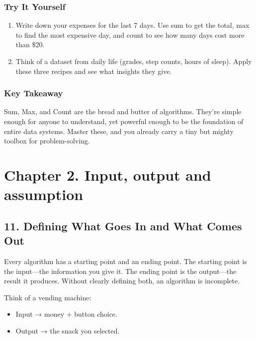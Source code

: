 \documentclass[
  letterpaper,
  DIV=11,
  numbers=noendperiod]{scrreprt}
\providecommand{\tightlist}{%
  \setlength{\itemsep}{0pt}\setlength{\parskip}{0pt}}
\begin{document}
\subsubsection{Try It Yourself}\label{try-it-yourself-9}

\begin{enumerate}
\def\labelenumi{\arabic{enumi}.}
\tightlist
\item
  Write down your expenses for the last 7 days. Use sum to get the
  total, max to find the most expensive day, and count to see how many
  days cost more than \$20.
\item
  Think of a dataset from daily life (grades, step counts, hours of
  sleep). Apply these three recipes and see what insights they give.
\end{enumerate}

\subsubsection{Key Takeaway}\label{key-takeaway-8}

Sum, Max, and Count are the bread and butter of algorithms. They're
simple enough for anyone to understand, yet powerful enough to be the
foundation of entire data systems. Master these, and you already carry a
tiny but mighty toolbox for problem-solving.

\section{Chapter 2. Input, output and
assumption}\label{chapter-2.-input-output-and-assumption}

\subsection{11. Defining What Goes In and What Comes
Out}\label{defining-what-goes-in-and-what-comes-out}

Every algorithm has a starting point and an ending point. The starting
point is the input---the information you give it. The ending point is
the output---the result it produces. Without clearly defining both, an
algorithm is incomplete.

Think of a vending machine:

\begin{itemize}
\tightlist
\item
  Input → money + button choice.
\item
  Output → the snack you selected.
\end{itemize}
\end{document}
